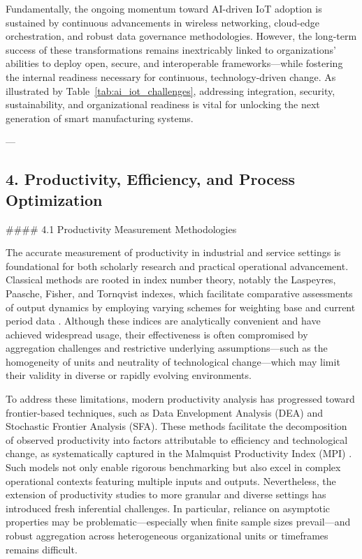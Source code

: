 \documentclass[11pt]{article}
\begin{document}
Fundamentally, the ongoing momentum toward AI-driven IoT adoption is sustained by continuous advancements in wireless networking, cloud-edge orchestration, and robust data governance methodologies. However, the long-term success of these transformations remains inextricably linked to organizations' abilities to deploy open, secure, and interoperable frameworks—while fostering the internal readiness necessary for continuous, technology-driven change. As illustrated by Table~\ref{tab:ai_iot_challenges}, addressing integration, security, sustainability, and organizational readiness is vital for unlocking the next generation of smart manufacturing systems.

---

\subsection{4. Productivity, Efficiency, and Process Optimization}

#### 4.1 Productivity Measurement Methodologies

The accurate measurement of productivity in industrial and service settings is foundational for both scholarly research and practical operational advancement. Classical methods are rooted in index number theory, notably the Laspeyres, Paasche, Fisher, and Tornqvist indexes, which facilitate comparative assessments of output dynamics by employing varying schemes for weighting base and current period data \cite{ref86}. Although these indices are analytically convenient and have achieved widespread usage, their effectiveness is often compromised by aggregation challenges and restrictive underlying assumptions—such as the homogeneity of units and neutrality of technological change—which may limit their validity in diverse or rapidly evolving environments.

To address these limitations, modern productivity analysis has progressed toward frontier-based techniques, such as Data Envelopment Analysis (DEA) and Stochastic Frontier Analysis (SFA). These methods facilitate the decomposition of observed productivity into factors attributable to efficiency and technological change, as systematically captured in the Malmquist Productivity Index (MPI) \cite{ref86}. Such models not only enable rigorous benchmarking but also excel in complex operational contexts featuring multiple inputs and outputs. Nevertheless, the extension of productivity studies to more granular and diverse settings has introduced fresh inferential challenges. In particular, reliance on asymptotic properties may be problematic—especially when finite sample sizes prevail—and robust aggregation across heterogeneous organizational units or timeframes remains difficult.
\end{document}
